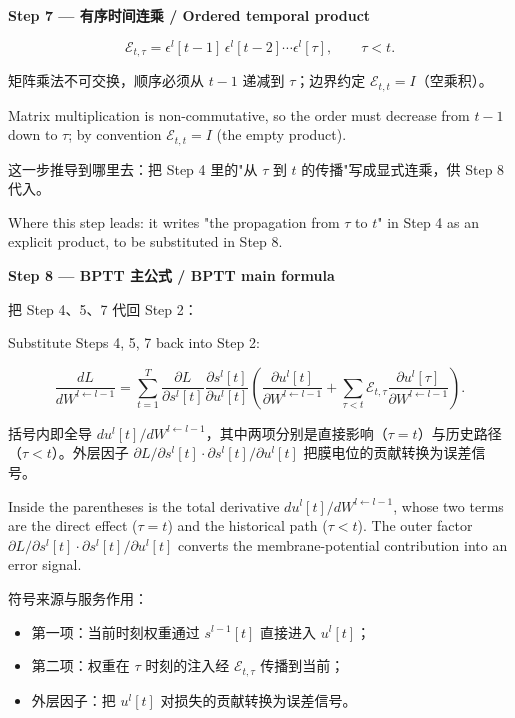 \documentclass[journal,12pt,onecolumn]{IEEEtran}
\begin{document}
\medskip\noindent\textbf{Step 7 — 有序时间连乘 / Ordered temporal product}

\begin{equation}
\mathcal{E}_{t,\tau} = \epsilon^l[t-1]\,\epsilon^l[t-2]\cdots\epsilon^l[\tau], \qquad \tau < t.
\end{equation}

矩阵乘法不可交换，顺序必须从 $t-1$ 递减到 $\tau$；边界约定 $\mathcal{E}_{t,t}=I$（空乘积）。

Matrix multiplication is non-commutative, so the order must decrease from $t-1$ down to $\tau$; by convention $\mathcal{E}_{t,t}=I$ (the empty product).

这一步推导到哪里去：把 Step 4 里的"从 $\tau$ 到 $t$ 的传播"写成显式连乘，供 Step 8 代入。

Where this step leads: it writes "the propagation from $\tau$ to $t$" in Step 4 as an explicit product, to be substituted in Step 8.

\medskip\noindent\textbf{Step 8 — BPTT 主公式 / BPTT main formula}

把 Step 4、5、7 代回 Step 2：

Substitute Steps 4, 5, 7 back into Step 2:

\begin{equation}
\frac{dL}{dW^{l\leftarrow l-1}} = \sum_{t=1}^{T} \frac{\partial L}{\partial s^l[t]} \frac{\partial s^l[t]}{\partial u^l[t]} \left( \frac{\partial u^l[t]}{\partial W^{l\leftarrow l-1}} + \sum_{\tau<t} \mathcal{E}_{t,\tau} \frac{\partial u^l[\tau]}{\partial W^{l\leftarrow l-1}} \right).
\end{equation}

括号内即全导 $du^l[t]/dW^{l\leftarrow l-1}$，其中两项分别是直接影响（$\tau=t$）与历史路径（$\tau<t$）。外层因子 $\partial L/\partial s^l[t]\cdot\partial s^l[t]/\partial u^l[t]$ 把膜电位的贡献转换为误差信号。

Inside the parentheses is the total derivative $du^l[t]/dW^{l\leftarrow l-1}$, whose two terms are the direct effect ($\tau=t$) and the historical path ($\tau<t$). The outer factor $\partial L/\partial s^l[t]\cdot\partial s^l[t]/\partial u^l[t]$ converts the membrane-potential contribution into an error signal.

符号来源与服务作用：
\begin{itemize}[leftmargin=1.5em,itemsep=2pt]
\item 第一项：当前时刻权重通过 $s^{l-1}[t]$ 直接进入 $u^l[t]$；
\item 第二项：权重在 $\tau$ 时刻的注入经 $\mathcal{E}_{t,\tau}$ 传播到当前；
\item 外层因子：把 $u^l[t]$ 对损失的贡献转换为误差信号。
\end{itemize}
\end{document}
